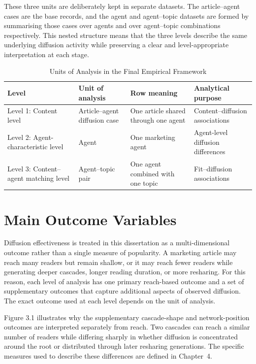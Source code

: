 These three units are deliberately kept in separate datasets. The article–agent cases are the base records, and the agent and agent–topic datasets are formed by summarising those cases over agents and over agent–topic combinations respectively. This nested structure means that the three levels describe the same underlying diffusion activity while preserving a clear and level-appropriate interpretation at each stage.

\begin{table}[H]
\centering
\scriptsize
\caption{Units of Analysis in the Final Empirical Framework}
\label{tab:3-3}
\renewcommand{\arraystretch}{1.15}
\begin{tabularx}{\textwidth}{>{\raggedright\arraybackslash}p{}>{\raggedright\arraybackslash}p{}>{\raggedright\arraybackslash}p{}>{\raggedright\arraybackslash}p{}}
\toprule
\textbf{Level} & \textbf{Unit of analysis} & \textbf{Row meaning} & \textbf{Analytical purpose} \\
\midrule
Level 1: Content level & Article–agent diffusion case & One article shared through one agent & Content–diffusion associations \\
Level 2: Agent-characteristic level & Agent & One marketing agent & Agent-level diffusion differences \\
Level 3: Content–agent matching level & Agent–topic pair & One agent combined with one topic & Fit–diffusion associations \\
\bottomrule
\end{tabularx}
\end{table}

\section{Main Outcome Variables}
\label{sec:3-5-main-outcome-variables}

Diffusion effectiveness is treated in this dissertation as a multi-dimensional outcome rather than a single measure of popularity. A marketing article may reach many readers but remain shallow, or it may reach fewer readers while generating deeper cascades, longer reading duration, or more resharing. For this reason, each level of analysis has one primary reach-based outcome and a set of supplementary outcomes that capture additional aspects of observed diffusion. The exact outcome used at each level depends on the unit of analysis.

Figure 3.1 illustrates why the supplementary cascade-shape and network-position outcomes are interpreted separately from reach. Two cascades can reach a similar number of readers while differing sharply in whether diffusion is concentrated around the root or distributed through later resharing generations. The specific measures used to describe these differences are defined in Chapter~4.

